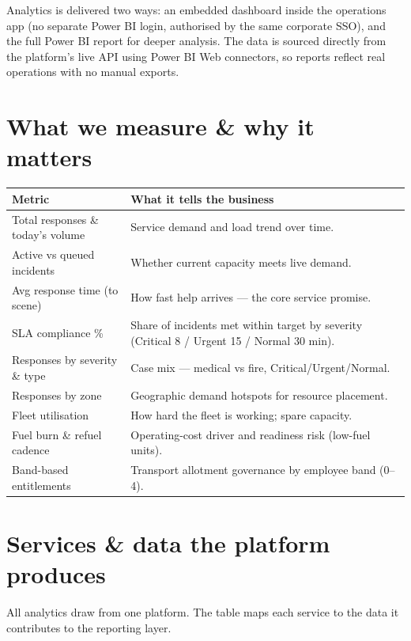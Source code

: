 \documentclass[11pt,a4paper]{article}
\begin{document}
Analytics is delivered two ways: an embedded dashboard inside the operations app (no separate
Power BI login, authorised by the same corporate SSO), and the full Power BI report for deeper
analysis. The data is sourced directly from the platform's live API using Power BI Web
connectors, so reports reflect real operations with no manual exports.

\section{What we measure \& why it matters}
\begin{tabularx}{\textwidth}{L{0.34\textwidth} X}
\toprule
{}\textbf{Metric} & \textbf{What it tells the business} \\
\midrule
Total responses \& today's volume & Service demand and load trend over time. \\
Active vs queued incidents & Whether current capacity meets live demand. \\
Avg response time (to scene) & How fast help arrives --- the core service promise. \\
SLA compliance \% & Share of incidents met within target by severity (Critical 8 / Urgent 15 / Normal 30 min). \\
Responses by severity \& type & Case mix --- medical vs fire, Critical/Urgent/Normal. \\
Responses by zone & Geographic demand hotspots for resource placement. \\
Fleet utilisation & How hard the fleet is working; spare capacity. \\
Fuel burn \& refuel cadence & Operating-cost driver and readiness risk (low-fuel units). \\
Band-based entitlements & Transport allotment governance by employee band (0--4). \\
\bottomrule
\end{tabularx}

\section{Services \& data the platform produces}
All analytics draw from one platform. The table maps each service to the data it contributes
to the reporting layer.
\end{document}
